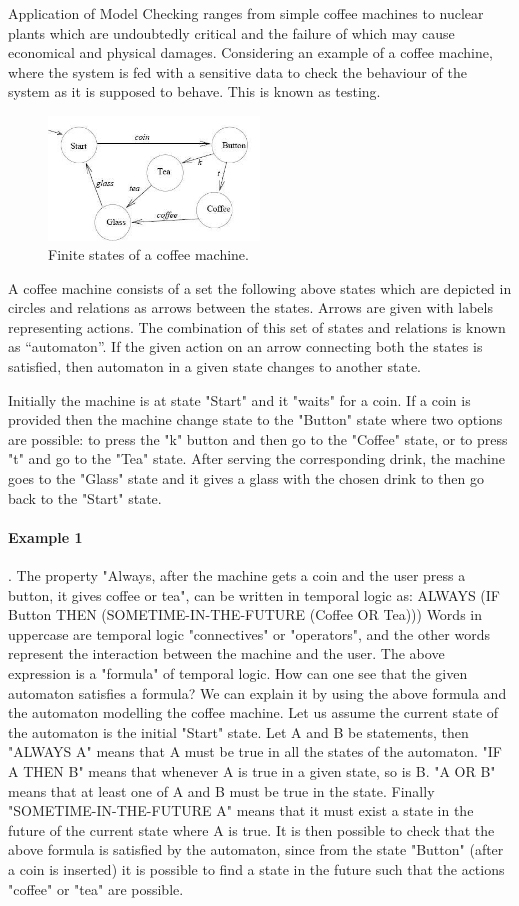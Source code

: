 \documentclass{article}
\begin{document}
Application of Model Checking ranges from simple coffee machines to nuclear plants which are undoubtedly critical and the failure of which may cause economical and physical damages. Considering an example of a coffee machine, where the system is fed with a sensitive data to check the behaviour of the system as it is supposed to behave. This is known as testing. 
 \begin{figure}[h!]

  \centering
   \includegraphics[width=0.5\textwidth]{flower.png}
    \caption{Finite states of a coffee machine.}
\end{figure}
A coffee machine consists of a set the following above states which are depicted in circles and relations as arrows between the states. Arrows are given with labels representing actions. The combination of this set of states and relations is known as “automaton”.  If the given action on an arrow connecting both the states is satisfied, then automaton in a given state changes to another state. 

Initially the machine is at state "Start" and it "waits" for a coin. If a coin is provided then the machine change state to the "Button" state where two options are possible: to press the "k" button and then go to the "Coffee" state, or to press "t" and go to the "Tea" state. After serving the corresponding drink, the machine goes to the "Glass" state and it gives a glass with the chosen drink to then go back to the "Start" state.
\paragraph{Example 1}.
The property "Always, after the machine gets a coin and the user press a button, it gives coffee or tea", can be written in temporal logic as:
ALWAYS (IF Button THEN (SOMETIME-IN-THE-FUTURE (Coffee OR Tea)))
Words in uppercase are temporal logic "connectives" or "operators", and the other words represent the interaction between the machine and the user. The above expression is a "formula" of temporal logic.
How can one see that the given automaton satisfies a formula? We can explain it by using the above formula and the automaton modelling the coffee machine.
Let us assume the current state of the automaton is the initial "Start" state. Let A and B be statements, then "ALWAYS A" means that A must be true in all the states of the automaton. "IF A THEN B" means that whenever A is true in a given state, so is B. "A OR B" means that at least one of A and B must be true in the state. Finally "SOMETIME-IN-THE-FUTURE A" means that it must exist a state in the future of the current state where A is true.
It is then possible to check that the above formula is satisfied by the automaton, since from the state "Button" (after a coin is inserted) it is possible to find a state in the future such that the actions "coffee" or "tea" are possible.
\end{document}
